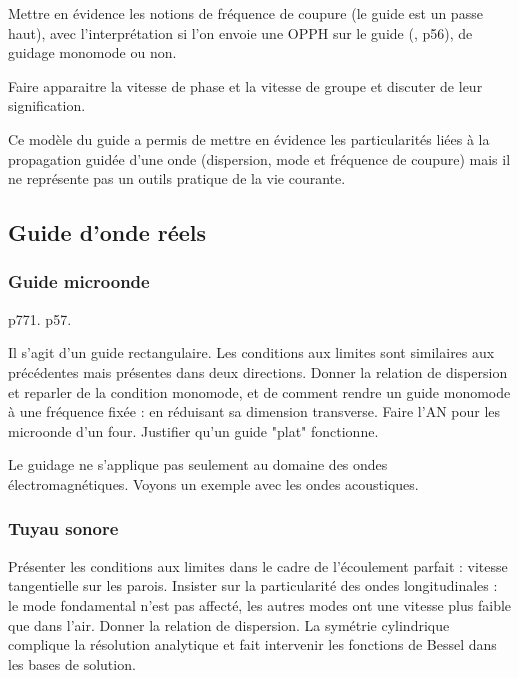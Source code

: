 Mettre en évidence les notions de fréquence de coupure (le guide est un passe haut), avec l'interprétation si l'on envoie une OPPH sur le guide (\cite{Thibierge2014}, p56), de guidage monomode ou non.

Faire apparaitre la vitesse de phase et la vitesse de groupe et discuter de leur signification.

\begin{transition}
Ce modèle du guide a permis de mettre en évidence les particularités liées à la propagation guidée d'une onde (dispersion, mode et fréquence de coupure) mais il ne représente pas un outils pratique de la vie courante.
\end{transition}

\subsection{Guide d'onde réels}

\subsubsection{Guide microonde}

\cite{Olivier2000} p771.
\cite{Thibierge2014} p57.

Il s'agit d'un guide rectangulaire.
Les conditions aux limites sont similaires aux précédentes mais présentes dans deux directions.
Donner la relation de dispersion et reparler de la condition monomode, et de comment rendre un guide monomode à une fréquence fixée : en réduisant sa dimension transverse. 
Faire l'AN pour les microonde d'un four.
Justifier qu'un guide "plat" fonctionne.

\begin{transition}
Le guidage ne s'applique pas seulement au domaine des ondes électromagnétiques.
Voyons un exemple avec les ondes acoustiques.
\end{transition}

\subsubsection{Tuyau sonore}

Présenter les conditions aux limites dans le cadre de l'écoulement parfait :  vitesse tangentielle sur les parois.
Insister sur la particularité des ondes longitudinales : le mode fondamental n'est pas affecté, les autres modes ont une vitesse plus faible que dans l'air.
Donner la relation de dispersion.
La symétrie cylindrique complique la résolution analytique et fait intervenir les fonctions de Bessel dans les bases de solution.

